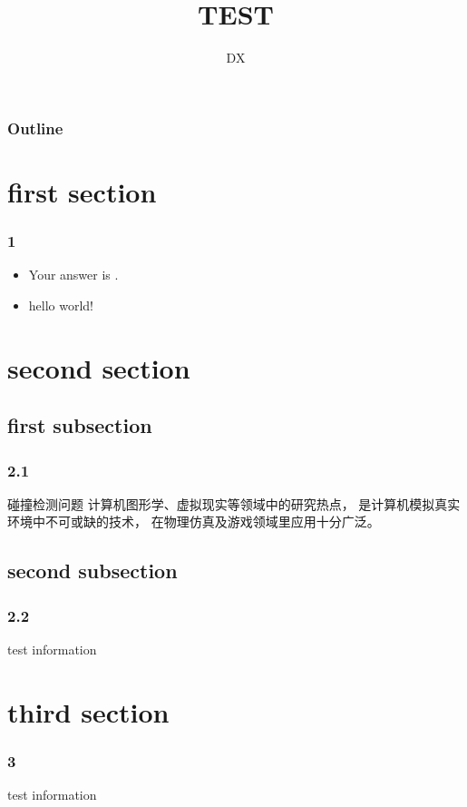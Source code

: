 \documentclass{beamer}
\begin{document}
\title{TEST}
\author{DX}
\begin{frame}
  \titlepage
\end{frame}

\begin{frame}
  \frametitle{Outline}
  \tableofcontents %
\end{frame}

\section{first section}
\begin{frame}
  \frametitle{1}
  \begin{itemize}
    \item Your answer is .
    \item hello world!
  \end{itemize}
\end{frame}

\section{second section}
\subsection{first subsection}
\begin{frame}
  \frametitle{2.1}
  \begin{block}{碰撞检测问题}
    计算机图形学、虚拟现实等领域中的研究热点，
    是计算机模拟真实环境中不可或缺的技术，
    在物理仿真及游戏领域里应用十分广泛。
  \end{block}
\end{frame}

\subsection{second subsection}
\begin{frame}
  \frametitle{2.2}
  test information
\end{frame}

\section{third section}
\begin{frame}
  \frametitle{3}
  test information
\end{frame}
\end{document}
